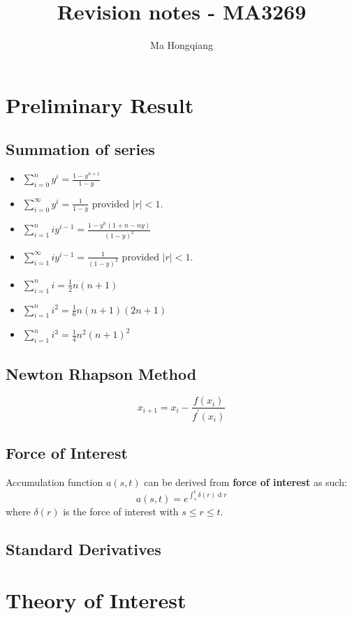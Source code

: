 \documentclass[12pt]{article}
\theoremstyle{definition}
\DeclareMathOperator{\diff}{d}
\begin{document}
\title{Revision notes - MA3269}
\author{Ma Hongqiang}
\maketitle
\tableofcontents

\clearpage
\section{Preliminary Result}
\subsection{Summation of series}
\begin{itemize}
  \item $\sum_{i=0}^n y^i = \frac{1-y^{n+1}}{1-y}$
  \item $\sum_{i=0}^\infty y^i = \frac{1}{1-y}\text{ provided }|r|<1$.
  \item $\sum_{i=1}^n iy^{i-1} = \frac{1-y^n(1+n-ny)}{(1-y)^2}$
  \item $\sum_{i=1}^\infty iy^{i-1} = \frac{1}{(1-y)^2}\text{ provided }|r|<1$.
  \item $\sum_{i=1}^n i = \frac{1}{2}n(n+1)$
  \item $\sum_{i=1}^n i^2 = \frac{1}{6}n(n+1)(2n+1)$
  \item $\sum_{i=1}^n i^3 = \frac{1}{4}n^2(n+1)^2$
\end{itemize}
\subsection{Newton Rhapson Method}
\[
x_{i+1} = x_i-\frac{f(x_i)}{f^\prime(x_i)}
\]
\subsection{Force of Interest}
Accumulation function $a(s,t)$ can be derived from \textbf{force of interest} as such:
\[
a(s,t) = e^{\int_s^t \delta(r)\diff r}
\]
where $\delta(r)$ is the force of interest with $s\leq r\leq t$.
\subsection{Standard Derivatives}

\clearpage
\section{Theory of Interest}
\end{document}
